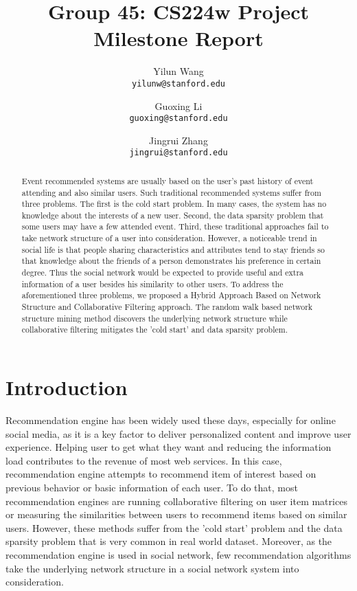 \documentclass{article}
\begin{document}
\title{Group 45: CS224w Project Milestone Report}
\author{Yilun Wang\\
\texttt{yilunw@stanford.edu}
 \and Guoxing Li\\
\texttt{guoxing@stanford.edu}
 \and Jingrui Zhang\\
 \texttt{jingrui@stanford.edu}}
\maketitle


\begin{abstract}

Event recommended systems are usually based on the user’s past history of event attending and also similar users. Such traditional recommended systems suffer from three problems. The first is the cold start problem. In many cases, the system has no knowledge about the interests of a new user. Second, the data sparsity problem that some users may have a few attended event. Third, these traditional approaches fail to take network structure of a user into consideration. However, a noticeable trend in social life is that people sharing characteristics and attributes tend to stay friends so that knowledge about the friends of a person demonstrates his preference in certain degree. Thus the social network would be expected to provide useful and extra information of a user besides his similarity to other users. To address the aforementioned three problems, we proposed a Hybrid Approach Based on Network Structure and Collaborative Filtering approach. The random walk based network structure mining method discovers the underlying network structure while collaborative filtering mitigates the 'cold start' and data sparsity problem. 

\end{abstract}


\section{Introduction}
Recommendation engine has been widely used these days, especially for online social media, as it is a key factor to deliver personalized content and improve user experience. Helping user to get what they want and reducing the information load contributes to the revenue of most web services. In this case, recommendation engine attempts to recommend item of interest based on previous behavior or basic information of each user. To do that, most recommendation engines are running collaborative filtering on user item matrices or measuring the similarities between users to recommend items based on similar users. However, these methods suffer from the 'cold start' problem and the data sparsity problem that is very common in real world dataset. Moreover, as the recommendation engine is used in social network, few recommendation algorithms take the underlying network structure in a social network system into consideration.  
\end{document}
